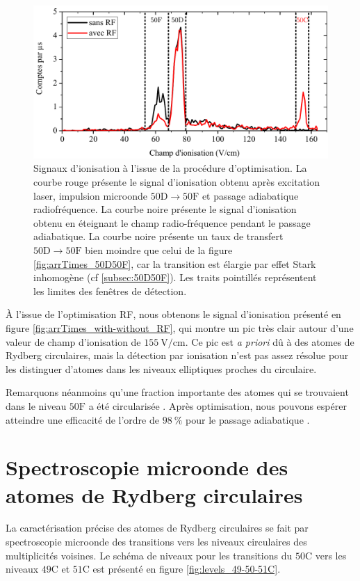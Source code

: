 %
\begin{figure}[b]
\centering
\includegraphics[width=\linewidth]{figures/circulars/arrTimes_with-without_RF}
\caption[Signaux d'ionisation des atomes circulaires]{
Signaux d'ionisation à l'issue de la procédure d'optimisation.
La courbe rouge présente le signal d'ionisation obtenu après excitation laser, impulsion microonde $\mathrm{50D \rightarrow 50F}$ et passage adiabatique radiofréquence.
La courbe noire présente le signal d'ionisation obtenu en éteignant le champ radio-fréquence pendant le passage adiabatique.
La courbe noire présente un taux de transfert $\mathrm{50D\rightarrow 50F}$ bien moindre que celui de la figure \eqref{fig:arrTimes_50D50F}, car la transition est élargie par effet Stark inhomogène (cf \ref{subsec:50D50F}).
Les traits pointillés représentent les limites des fenêtres de détection.
}
\label{fig:arrTimes_with-without_RF}
\end{figure}

\`A l'issue de l'optimisation RF, nous obtenons le signal d'ionisation présenté en figure \eqref{fig:arrTimes_with-without_RF}, qui montre un pic très clair autour d'une valeur de champ d'ionisation de  $\SI{155}{\V/\cm}$.
Ce pic est \textit{a priori} dû à des atomes de Rydberg circulaires, mais la détection par ionisation n'est pas assez résolue pour les distinguer d'atomes dans les niveaux elliptiques proches du circulaire.

Remarquons néanmoins qu'une fraction importante des atomes qui se trouvaient dans le niveau $\mathrm{50F}$ a été \og circularisée \fg{}.
Après optimisation, nous pouvons espérer atteindre une efficacité de l'ordre de $\SI{98}{\percent}$ pour le passage adiabatique \cite{PHD_DIETSCHE}.

\clearpage
\section{Spectroscopie microonde des atomes de Rydberg circulaires}
\noindent La caractérisation précise des atomes de Rydberg circulaires se fait par spectroscopie microonde des transitions vers les niveaux circulaires des multiplicités voisines.
%
Le schéma de niveaux pour les transitions du $\mathrm{50C}$ vers les niveaux $\mathrm{49C}$ et $\mathrm{51C}$ est présenté en figure \eqref{fig:levels_49-50-51C}.


